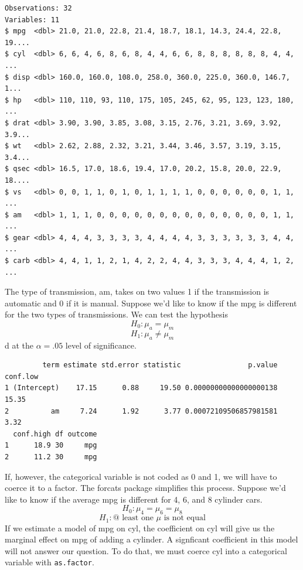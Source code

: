 \documentclass[]{book}
\newenvironment{Shaded}{\begin{snugshade}}{\end{snugshade}}
\newcommand{\KeywordTok}[1]{\textcolor[rgb]{0.13,0.29,0.53}{\textbf{#1}}}
\newcommand{\NormalTok}[1]{#1}
\newcommand{\OperatorTok}[1]{\textcolor[rgb]{0.81,0.36,0.00}{\textbf{#1}}}
\newcommand{\StringTok}[1]{\textcolor[rgb]{0.31,0.60,0.02}{#1}}
\begin{document}
\begin{verbatim}
Observations: 32
Variables: 11
$ mpg  <dbl> 21.0, 21.0, 22.8, 21.4, 18.7, 18.1, 14.3, 24.4, 22.8, 19....
$ cyl  <dbl> 6, 6, 4, 6, 8, 6, 8, 4, 4, 6, 6, 8, 8, 8, 8, 8, 8, 4, 4, ...
$ disp <dbl> 160.0, 160.0, 108.0, 258.0, 360.0, 225.0, 360.0, 146.7, 1...
$ hp   <dbl> 110, 110, 93, 110, 175, 105, 245, 62, 95, 123, 123, 180, ...
$ drat <dbl> 3.90, 3.90, 3.85, 3.08, 3.15, 2.76, 3.21, 3.69, 3.92, 3.9...
$ wt   <dbl> 2.62, 2.88, 2.32, 3.21, 3.44, 3.46, 3.57, 3.19, 3.15, 3.4...
$ qsec <dbl> 16.5, 17.0, 18.6, 19.4, 17.0, 20.2, 15.8, 20.0, 22.9, 18....
$ vs   <dbl> 0, 0, 1, 1, 0, 1, 0, 1, 1, 1, 1, 0, 0, 0, 0, 0, 0, 1, 1, ...
$ am   <dbl> 1, 1, 1, 0, 0, 0, 0, 0, 0, 0, 0, 0, 0, 0, 0, 0, 0, 1, 1, ...
$ gear <dbl> 4, 4, 4, 3, 3, 3, 3, 4, 4, 4, 4, 3, 3, 3, 3, 3, 3, 4, 4, ...
$ carb <dbl> 4, 4, 1, 1, 2, 1, 4, 2, 2, 4, 4, 3, 3, 3, 4, 4, 4, 1, 2, ...
\end{verbatim}

The type of transmission, am, takes on two values 1 if the transmission is automatic and 0 if it is manual. Suppose we'd like to know if the mpg is different for the two types of transmissions. We can test the hypothesis \[H_0:\mu_a=\mu_m\] \[H_1:\mu_a\ne\mu_m\]d at the \(\alpha=.05\) level of significance.

\begin{Shaded}
\end{Shaded}

\begin{verbatim}
         term estimate std.error statistic                p.value conf.low
1 (Intercept)    17.15      0.88     19.50 0.00000000000000000138    15.35
2          am     7.24      1.92      3.77 0.00072109506857981581     3.32
  conf.high df outcome
1      18.9 30     mpg
2      11.2 30     mpg
\end{verbatim}

If, however, the categorical variable is not coded as 0 and 1, we will have to coerce it to a factor. The forcats package simplifies this process. Suppose we'd like to know if the average mpg is different for 4, 6, and 8 cylinder cars. \[H_0:\mu_4=\mu_6=\mu_8\] \[H_1:\text{@ least one }\mu\text{ is not equal}\]If we estimate a model of mpg on cyl, the coefficient on cyl will give us the marginal effect on mpg of adding a cylinder. A signficant coefficient in this model will not answer our question. To do that, we must coerce cyl into a categorical variable with \texttt{as.factor}.
\end{document}
